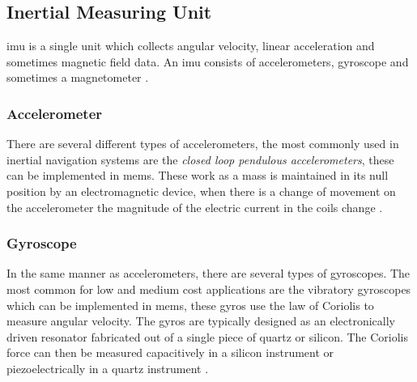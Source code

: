 \subsection{Inertial Measuring Unit}
\acrfull{imu} is a single unit which collects angular velocity, linear acceleration and sometimes magnetic field data. An \acrshort{imu} consists of accelerometers, gyroscope and sometimes a magnetometer \cite{vik}. 

\subsubsection{Accelerometer}
There are several different types of accelerometers, the most commonly used in inertial navigation systems are the \textit{closed loop pendulous accelerometers}, these can be implemented in \acrfull{mems}. These work as a mass is maintained in its null position by an electromagnetic device, when there is a change of movement on the accelerometer the magnitude of the electric current in the coils change \cite{vik}.

\subsubsection{Gyroscope}
In the same manner as accelerometers, there are several types of gyroscopes. The most common for low and medium cost applications are the vibratory gyroscopes which can be implemented in \acrshort{mems}, these gyros use the law of Coriolis to measure angular velocity. The gyros are typically designed as an electronically driven resonator fabricated out of a single piece of quartz or silicon. The Coriolis force can then be measured capacitively in a silicon instrument or piezoelectrically in a quartz instrument \cite{vik}.